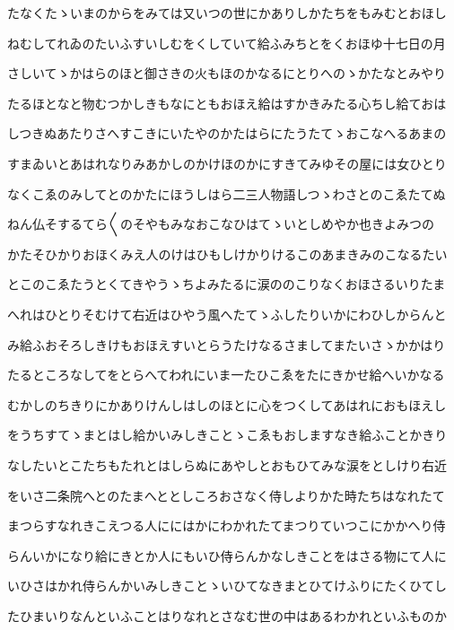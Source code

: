 \documentclass[a4paper,11pt,landscape]{ltjtarticle}
\begin{document}
\par\medskip
たなくたゝいまのからをみては又いつの世にかありしかたちをもみむとおほし
\par\medskip
ねむしてれゐのたいふすいしむをくしていて給ふみちとをくおほゆ十七日の月
\par\medskip
さしいてゝかはらのほと御さきの火もほのかなるにとりへのゝかたなとみやり
\par\medskip
たるほとなと物むつかしきもなにともおほえ給はすかきみたる心ちし給ておは
\par\medskip
しつきぬあたりさへすこきにいたやのかたはらにたうたてゝおこなへるあまの
\par\medskip
すまゐいとあはれなりみあかしのかけほのかにすきてみゆその屋には女ひとり
\par\medskip
なくこゑのみしてとのかたにほうしはら二三人物語しつゝわさとのこゑたてぬ
\par\medskip
ねん仏そするてら〱のそやもみなおこなひはてゝいとしめやか也きよみつの
\par\medskip
かたそひかりおほくみえ人のけはひもしけかりけるこのあまきみのこなるたい
\par\medskip
とこのこゑたうとくてきやうゝちよみたるに涙ののこりなくおほさるいりたま
\par\medskip
へれはひとりそむけて右近はひやう風へたてゝふしたりいかにわひしからんと
\par\medskip
み給ふおそろしきけもおほえすいとらうたけなるさましてまたいさゝかかはり
\par\medskip
たるところなしてをとらへてわれにいま一たひこゑをたにきかせ給へいかなる
\par\medskip
むかしのちきりにかありけんしはしのほとに心をつくしてあはれにおもほえし
\par\medskip
をうちすてゝまとはし給かいみしきことゝこゑもおしますなき給ふことかきり
\par\medskip
なしたいとこたちもたれとはしらぬにあやしとおもひてみな涙をとしけり右近
\par\medskip
をいさ二条院へとのたまへととしころおさなく侍しよりかた時たちはなれたて
\par\medskip
まつらすなれきこえつる人ににはかにわかれたてまつりていつこにかかへり侍
\par\medskip
らんいかになり給にきとか人にもいひ侍らんかなしきことをはさる物にて人に
\par\medskip
いひさはかれ侍らんかいみしきことゝいひてなきまとひてけふりにたくひてし
\par\medskip
たひまいりなんといふことはりなれとさなむ世の中はあるわかれといふものか
\end{document}
